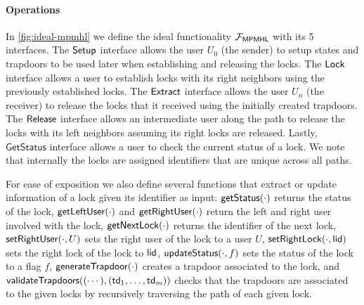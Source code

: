 \paragraph{Operations}
In \cref{fig:ideal-mpmhl} we define the ideal functionality $\mathcal{F}_{\mathsf{MPMHL}}$ with its 5 
interfaces. The $\mathsf{Setup}$ interface allows the user $U_0$ (the sender) to setup states and 
trapdoors to be used later when establishing and releasing the locks. The $\mathsf{Lock}$ interface 
allows a user to establish locks with its right neighbors using the previously established 
locks. The $\mathsf{Extract}$ interface allows the user $U_n$ (the receiver) to release the locks that it 
received using the initially created trapdoors. The $\mathsf{Release}$ interface allows an intermediate 
user along the path to release the locks with its left neighbors assuming its right locks are 
released. Lastly, $\mathsf{GetStatus}$ interface allows a user to check the current status of 
a lock. We note that internally the locks are assigned identifiers that are unique across all 
paths.

For ease of exposition we also define several functions that extract or update information of 
a lock given its identifier as input: $\mathsf{getStatus}(\cdot)$ returns the status of the lock, 
$\mathsf{getLeftUser}(\cdot)$ and $\mathsf{getRightUser}(\cdot)$ return the left and right user involved with the 
lock, $\mathsf{getNextLock}(\cdot)$ returns the identifier of the next lock, $\mathsf{setRightUser}(\cdot, U)$ 
sets the right user of the lock to a user $U$, $\mathsf{setRightLock}(\cdot, \mathsf{lid})$ sets the right lock 
of the lock to $\mathsf{lid}$, $\mathsf{updateStatus}(\cdot, f)$ sets the status of the lock to a flag $f$, 
$\mathsf{generateTrapdoor}(\cdot)$ creates a trapdoor associated to the lock, and $\mathsf{validateTrapdoors}
((\cdots), (\mathsf{td}_1,\ldots,\mathsf{td}_m))$ checks that the trapdoors are associated to the given locks 
by recursively traversing the path of each given lock.

